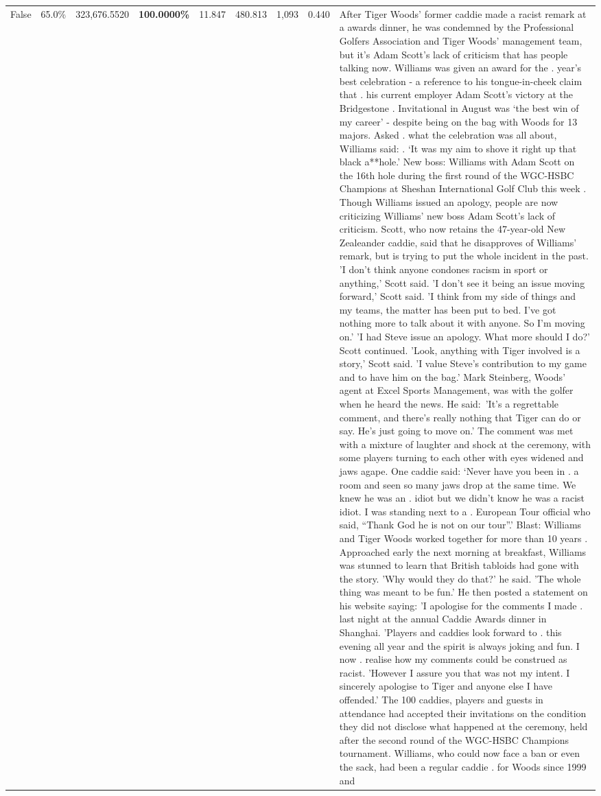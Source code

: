 \begin{table}[H]
\begin{tabular}{lllrlllll}
False & 65.0\% & 323,676.5520 & \bfseries \color{red} 100.0000\% & 11.847 & 480.813 & 1,093 & 0.440 & After Tiger Woods' former caddie made a racist remark at a awards dinner, he was condemned by the Professional Golfers Association and Tiger Woods' management team, but it's Adam Scott's lack of criticism that has people talking now. Williams was given an award for the . year’s best celebration - a reference to his tongue-in-cheek claim that . his current employer Adam Scott’s victory at the Bridgestone . Invitational in August was ‘the best win of my career’ - despite being on the bag with Woods for 13 majors. Asked . what the celebration was all about, Williams said: . ‘It was my aim to shove it right up that black a**hole.’ New boss: Williams with Adam Scott  on the 16th hole during the first round of the WGC-HSBC Champions at Sheshan International Golf Club this week . Though Williams issued an apology, people are now criticizing Williams' new boss Adam Scott's lack of criticism. Scott, who now retains the 47-year-old New Zealeander caddie, said that he disapproves of Williams' remark, but is trying to put the whole incident in the past. 'I don't think anyone condones racism in sport or anything,' Scott said. 'I don't see it being an issue moving forward,' Scott said. 'I think from my side of things and my teams, the matter has been put to bed. I've got nothing more to talk about it with anyone. So I'm moving on.' 'I had Steve issue an apology. What more should I do?' Scott continued. 'Look, anything with Tiger involved is a story,' Scott said. 'I value Steve's contribution to my game and to have him on the bag.' Mark Steinberg, Woods' agent at Excel Sports Management, was with the golfer when he heard the news. He said: 'It's a regrettable comment, and there's really nothing that Tiger can do or say. He's just going to move on.' The comment was met with a mixture of laughter and shock at the ceremony, with some players turning to each other with eyes widened and jaws agape. One caddie said: ‘Never have you been in . a room and seen so many jaws drop at the same time. We knew he was an . idiot but we didn’t know he was a racist idiot. I was standing next to a . European Tour official who said, “Thank God he is not on our tour”.’ Blast: Williams and Tiger Woods worked together for more than 10 years . Approached early the next morning at breakfast, Williams was stunned to learn that British tabloids had gone with the story. 'Why would they do that?' he said. 'The whole thing was meant to be fun.' He then posted a statement on his website saying: 'I apologise for the comments I made . last night at the annual Caddie Awards dinner in Shanghai. 'Players and caddies look forward to . this evening all year and the spirit is always joking and fun. I now . realise how my comments could be construed as racist. 'However I assure you that was not my intent. I sincerely apologise to Tiger and anyone else I have offended.' The 100 caddies, players and guests in attendance had accepted their invitations on the condition they did not disclose what happened at the ceremony, held after the second round of the WGC-HSBC Champions tournament. Williams, who could now face a ban or even the sack, had been a regular caddie . for Woods since 1999 and 
\end{tabular}
\end{table}
